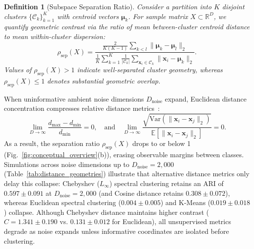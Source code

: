 \documentclass[pdflatex,sn-mathphys-num]{sn-jnl}
\theoremstyle{thmstyleone}
\theoremstyle{thmstyletwo}
\theoremstyle{thmstylethree}
\newtheorem{definition}{Definition}
\begin{document}
\begin{definition}[Subspace Separation Ratio]
Consider a partition into $K$ disjoint clusters $\{\mathcal{C}_k\}_{k=1}^K$ with centroid vectors $\boldsymbol{\mu}_k$. For sample matrix $X \subset \mathbb{R}^D$, we quantify geometric contrast via the ratio of mean between-cluster centroid distance to mean within-cluster dispersion:
\begin{equation}
  \rho_{\text{sep}}(X) = \frac{\frac{2}{K(K-1)}\sum_{k < l} \|\boldsymbol{\mu}_k - \boldsymbol{\mu}_l\|_2}{\frac{1}{K}\sum_{k=1}^K \frac{1}{|\mathcal{C}_k|}\sum_{\mathbf{x}_i \in \mathcal{C}_k} \|\mathbf{x}_i - \boldsymbol{\mu}_k\|_2}.
\end{equation}
Values of $\rho_{\text{sep}}(X) > 1$ indicate well-separated cluster geometry, whereas $\rho_{\text{sep}}(X) \le 1$ denotes substantial geometric overlap.
\end{definition}

When uninformative ambient noise dimensions $D_{\text{noise}}$ expand, Euclidean distance concentration compresses relative distance metrics~\cite{beyer1999nearest,peng2024interpreting}:
\begin{equation}\label{eq:dist_concentration}
  \lim_{D \to \infty} \frac{d_{\max} - d_{\min}}{d_{\min}} = 0, \quad \text{and} \quad \lim_{D \to \infty} \frac{\sqrt{\mathrm{Var}(\|\mathbf{x}_i - \mathbf{x}_j\|_2)}}{\mathbb{E}[\|\mathbf{x}_i - \mathbf{x}_j\|_2]} = 0.
\end{equation}
As a result, the separation ratio $\rho_{\text{sep}}(X)$ drops to or below 1 (Fig.~\ref{fig:conceptual_overview}(b)), erasing observable margins between classes. Simulations across noise dimensions up to $D_{\text{noise}}=2{,}000$ (Table~\ref{tab:distance_geometries}) illustrate that alternative distance metrics only delay this collapse: Chebyshev ($L_\infty$) spectral clustering retains an ARI of $0.597 \pm 0.091$ at $D_{\text{noise}}=2{,}000$ (and Cosine distance retains $0.308 \pm 0.072$), whereas Euclidean spectral clustering ($0.004 \pm 0.005$) and K-Means ($0.019 \pm 0.018$) collapse. Although Chebyshev distance maintains higher contrast ($C = 1.341 \pm 0.190$ vs. $0.131 \pm 0.012$ for Euclidean), all unsupervised metrics degrade as noise expands unless informative coordinates are isolated before clustering.


\end{document}
